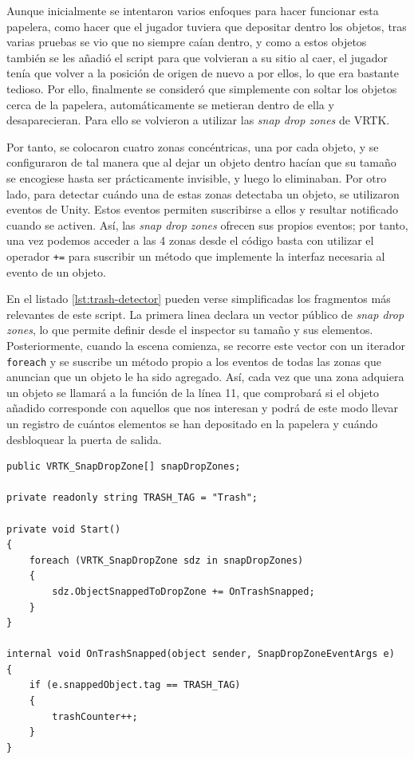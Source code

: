Aunque inicialmente se intentaron varios enfoques para hacer funcionar esta papelera, como hacer que el jugador tuviera que depositar dentro los objetos, tras varias pruebas se vio que no siempre caían dentro, y como a estos objetos también se les añadió el script para que volvieran a su sitio al caer, el jugador tenía que volver a la posición de origen de nuevo a por ellos, lo que era bastante tedioso. Por ello, finalmente se consideró que simplemente con soltar los objetos cerca de la papelera, automáticamente se metieran dentro de ella y desaparecieran. Para ello se volvieron a utilizar las \textit{snap drop zones} de \acs{VRTK}. 

Por tanto, se colocaron cuatro zonas concéntricas, una por cada objeto, y se configuraron de tal manera que al dejar un objeto dentro hacían que su tamaño se encogiese hasta ser prácticamente invisible, y luego lo eliminaban. Por otro lado, para detectar cuándo una de estas zonas detectaba un objeto, se utilizaron eventos de Unity. Estos eventos permiten suscribirse a ellos y resultar notificado cuando se activen. Así, las \textit{snap drop zones} ofrecen sus propios eventos; por tanto, una vez podemos acceder a las 4 zonas desde el código basta con utilizar el operador \texttt{+=} para suscribir un método que implemente la interfaz necesaria al evento de un objeto.

En el listado \ref{lst:trash-detector} pueden verse simplificadas los fragmentos más relevantes de este script. La primera linea declara un vector público de \textit{snap drop zones}, lo que permite definir desde el inspector su tamaño y sus elementos. Posteriormente, cuando la escena comienza, se recorre este vector con un iterador \texttt{foreach} y se suscribe un método propio a los eventos de todas las zonas que anuncian que un objeto le ha sido agregado. Así, cada vez que una zona adquiera un objeto se llamará a la función de la línea 11, que comprobará si el objeto añadido corresponde con aquellos que nos interesan y podrá de este modo llevar un registro de cuántos elementos se han depositado en la papelera y cuándo desbloquear la puerta de salida. 

\begin{lstlisting}[caption=Fragmento del script para detectar piezas de basura, label=lst:trash-detector]
public VRTK_SnapDropZone[] snapDropZones;

private readonly string TRASH_TAG = "Trash";

private void Start()
{
    foreach (VRTK_SnapDropZone sdz in snapDropZones)
    {
        sdz.ObjectSnappedToDropZone += OnTrashSnapped;
    }
}

internal void OnTrashSnapped(object sender, SnapDropZoneEventArgs e)
{
    if (e.snappedObject.tag == TRASH_TAG)
    {
        trashCounter++;
    }
}
\end{lstlisting}

